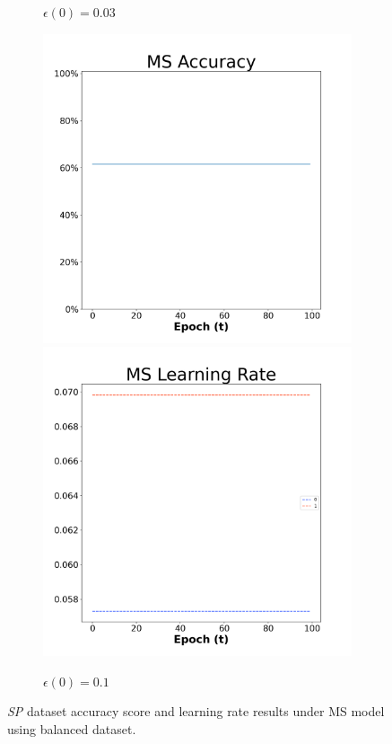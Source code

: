\begin{figure}[H]
\begin{subfigure}{0.3\textwidth}
  \caption{$\epsilon(0)=0.03$}
\end{subfigure}\hfil %
\begin{subfigure}{0.3\textwidth}
  \includegraphics[width=\linewidth]{images/exper1/SP/MS_0.1_acc.png}
  \includegraphics[width=\linewidth]{images/exper1/SP/MS_0.1_lr.png}
  \caption{$\epsilon(0)=0.1$}
\end{subfigure}

\caption{\textit{SP} dataset accuracy score and learning rate results under MS model using balanced dataset.}
\end{figure}

